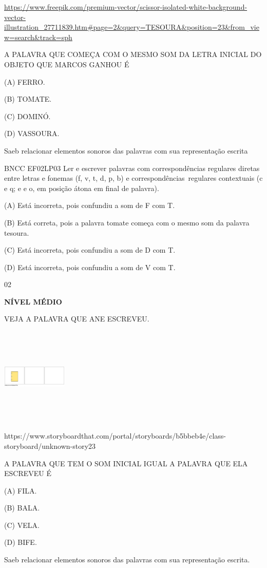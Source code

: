 {{\url{https://www.freepik.com/premium-vector/scissor-isolated-white-background-vector-illustration_27711839.htm\#page=2\&query=TESOURA\&position=23\&from_view=search\&track=sph}

A PALAVRA QUE COMEÇA COM O MESMO SOM DA LETRA INICIAL DO OBJETO QUE
MARCOS GANHOU É

(A) FERRO.

(B) TOMATE.

(C) DOMINÓ.

(D) VASSOURA.

Saeb relacionar elementos sonoros das palavras com sua representação
escrita

BNCC EF02LP03 Ler e escrever palavras com correspondências regulares
diretas entre letras e fonemas (f, v, t, d, p, b) e
correspondências~regulares contextuais (c e q; e e o, em posição átona
em final de palavra).

(A) Está incorreta, pois confundiu a som de F com T.

(B) Está correta, pois a palavra tomate começa com o mesmo som da
palavra tesoura.

(C) Está incorreta, pois confundiu a som de D com T.

(D) Está incorreta, pois confundiu a som de V com T.

\num{02}

\textbf{NÍVEL MÉDIO}

VEJA A PALAVRA QUE ANE ESCREVEU.

\includegraphics[width=1.22986in,height=1.82986in]{media/image164.png}

https://www.storyboardthat.com/portal/storyboards/b5bbeb4e/class-storyboard/unknown-story23

A PALAVRA QUE TEM O SOM INICIAL IGUAL A PALAVRA QUE ELA ESCREVEU É

(A) FILA.

(B) BALA.

(C) VELA.

(D) BIFE.

Saeb relacionar elementos sonoros das palavras com sua representação
escrita.

}}
